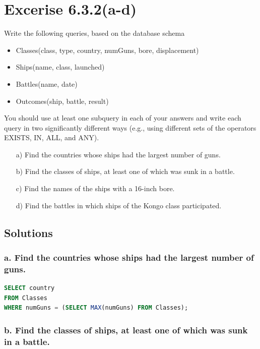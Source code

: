 \documentclass{cshwk}
\begin{document}
\section{Excerise 6.3.2(a-d)}
Write the following queries, based on the database schema

\begin{itemize}
    \item Classes(class, type, country, numGuns, bore, displacement)
    \item Ships(name, class, launched)
    \item Battles(name, date)
    \item Outcomes(ship, battle, result)
\end{itemize}

You should use at least one subquery in each of your answers and write each query in two significantly different ways (e.g., using different sets of the operators EXISTS, IN, ALL, and ANY).

\begin{enumerate}
    \item[a)] Find the countries whose ships had the largest number of guns.
    \item[b)] Find the classes of ships, at least one of which was sunk in a battle.
    \item[c)] Find the names of the  ships with a 16-inch bore.
    \item[d)] Find the battles in which ships of the Kongo class participated.
\end{enumerate}

\subsection{Solutions}

\subsubsection*{a. Find the countries whose ships had the largest number of guns.}

\begin{lstlisting}[language=sql]
SELECT country
FROM Classes
WHERE numGuns = (SELECT MAX(numGuns) FROM Classes);
\end{lstlisting}

\subsubsection*{b. Find the classes of ships, at least one of which was sunk in a battle.}
\end{document}
